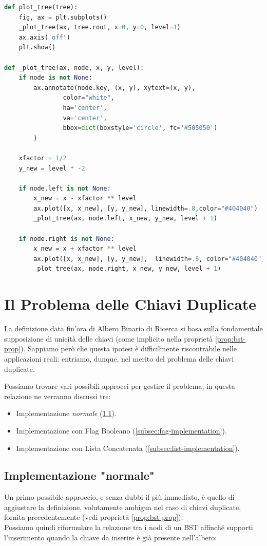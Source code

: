 \documentclass{article}
\begin{document}
\begin{lstlisting}[language=Python, caption={Rappresentazione Grfaica di un BST}, label={lst:plot_tree}]
def plot_tree(tree):
    fig, ax = plt.subplots()
    _plot_tree(ax, tree.root, x=0, y=0, level=1)
    ax.axis('off')
    plt.show()

def _plot_tree(ax, node, x, y, level):
    if node is not None:
        ax.annotate(node.key, (x, y), xytext=(x, y),
                color="white",    
                ha='center',
                va='center', 
                bbox=dict(boxstyle='circle', fc='#505050')
        )

    xfactor = 1/2
    y_new = level * -2

    if node.left is not None:
        x_new = x - xfactor ** level
        ax.plot([x, x_new], [y, y_new], linewidth=.8,color="#404040")
        _plot_tree(ax, node.left, x_new, y_new, level + 1)

    if node.right is not None:
        x_new = x + xfactor ** level
        ax.plot([x, x_new], [y, y_new],  linewidth=.8, color="#404040")
        _plot_tree(ax, node.right, x_new, y_new, level + 1)
\end{lstlisting}


\section{Il Problema delle Chiavi Duplicate}
La definizione data fin'ora di Albero Binario di Ricerca si basa sulla fondamentale supposizione di unicità delle chiavi
(come implicito nella proprietà \ref{prop:bst-prop}).
Sappiamo però che questa ipotesi è difficilmente riscontrabile nelle applicazioni reali:
entriamo, dunque, nel merito del problema delle chiavi duplicate.

Possiamo trovare vari possibili approcci per gestire il problema, in questa relazione ne verranno discussi tre:  



\begin{itemize}
	\item Implementazione \textit{normale} (\ref{subsec:normal-implementation}).
	\item Implementazione con Flag Booleano (\ref{subsec:fag-implementation}).
	\item Implementazione con Lista Concatenata (\ref{subsec:list-implementation}).
\end{itemize}


 
\subsection{Implementazione "normale"}\label{subsec:normal-implementation}
Un primo possibile approccio, e senza dubbi il più immediato, è quello di aggiustare la definizione, volutamente ambigua nel caso di chiavi duplicate, fornita precedentemente (vedi proprietà \ref{prop:bst-prop}).\\
Possiamo quindi riformulare la relazione tra i nodi di un BST affinché supporti l'inserimento quando la chiave da inserire è già presente nell'albero:
\end{document}
